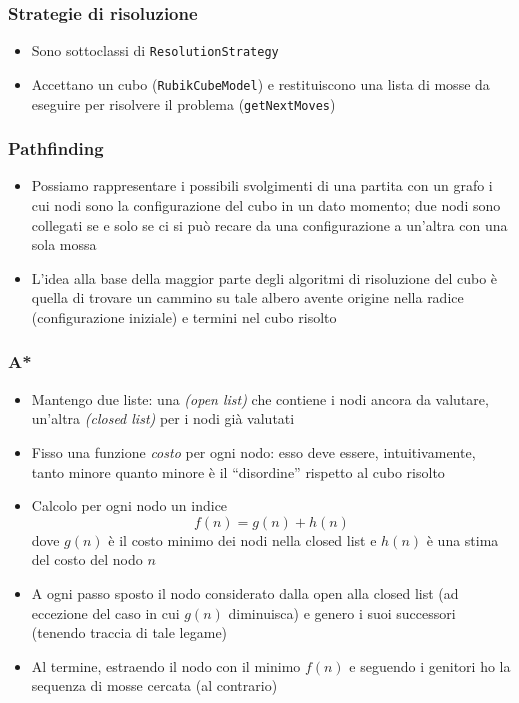 \documentclass{beamer}
\begin{document}
\begin{frame}
\frametitle{Strategie di risoluzione}
\begin{itemize}
\item Sono sottoclassi di \texttt{ResolutionStrategy}
\item Accettano un cubo (\texttt{RubikCubeModel}) e restituiscono una lista di
mosse da eseguire per risolvere il problema (\texttt{getNextMoves})
\end{itemize}
\end{frame}

\begin{frame}
\frametitle{Pathfinding}
\begin{itemize}
\item Possiamo rappresentare i possibili svolgimenti di una partita con un
grafo i cui nodi sono la configurazione del cubo in un dato momento; due nodi
sono collegati se e solo se ci si può recare da una configurazione a un'altra
con una sola mossa
\item L'idea alla base della maggior parte degli algoritmi di risoluzione del
cubo è quella di trovare un cammino su tale albero avente origine nella radice
(configurazione iniziale) e termini nel cubo risolto
\end{itemize}
\end{frame}

\begin{frame}
\frametitle{A*}
\begin{itemize}
\item Mantengo due liste: una \emph{(open list)} che contiene i nodi ancora da
valutare, un'altra \emph{(closed list)} per i nodi già valutati
\item Fisso una funzione \emph{costo} per ogni nodo: esso deve essere,
intuitivamente, tanto minore quanto minore è il ``disordine'' rispetto al cubo
risolto
\item Calcolo per ogni nodo un indice
\[
f(n) = g(n) + h(n)
\]
dove $g(n)$ è il costo minimo dei nodi nella closed list e $h(n)$ è una stima
del costo del nodo $n$
\item A ogni passo sposto il nodo considerato dalla open alla closed list (ad
eccezione del caso in cui $g(n)$ diminuisca) e genero i suoi successori
(tenendo traccia di tale legame)
\item Al termine, estraendo il nodo con il minimo $f(n)$ e seguendo i genitori
ho la sequenza di mosse cercata (al contrario)
\end{itemize}
\end{frame}
\end{document}
